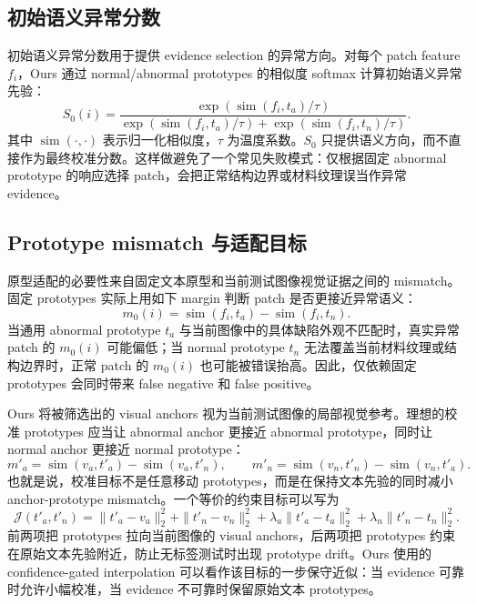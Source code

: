 \documentclass[runningheads]{llncs}
\newcommand{\simi}{\operatorname{sim}}
\begin{document}
\subsection{初始语义异常分数}

初始语义异常分数用于提供 evidence selection 的异常方向。对每个 patch feature $f_i$，Ours 通过 normal/abnormal prototypes 的相似度 softmax 计算初始语义异常先验：
\begin{equation}
S_0(i)=
\frac{\exp(\simi(f_i,t_a)/\tau)}
{\exp(\simi(f_i,t_a)/\tau)+\exp(\simi(f_i,t_n)/\tau)} .
\end{equation}
其中 $\simi(\cdot,\cdot)$ 表示归一化相似度，$\tau$ 为温度系数。$S_0$ 只提供语义方向，而不直接作为最终校准分数。这样做避免了一个常见失败模式：仅根据固定 abnormal prototype 的响应选择 patch，会把正常结构边界或材料纹理误当作异常 evidence。

\subsection{Prototype mismatch 与适配目标}

原型适配的必要性来自固定文本原型和当前测试图像视觉证据之间的 mismatch。固定 prototypes 实际上用如下 margin 判断 patch 是否更接近异常语义：
\begin{equation}
m_0(i)=\simi(f_i,t_a)-\simi(f_i,t_n).
\end{equation}
当通用 abnormal prototype $t_a$ 与当前图像中的具体缺陷外观不匹配时，真实异常 patch 的 $m_0(i)$ 可能偏低；当 normal prototype $t_n$ 无法覆盖当前材料纹理或结构边界时，正常 patch 的 $m_0(i)$ 也可能被错误抬高。因此，仅依赖固定 prototypes 会同时带来 false negative 和 false positive。

Ours 将被筛选出的 visual anchors 视为当前测试图像的局部视觉参考。理想的校准 prototypes 应当让 abnormal anchor 更接近 abnormal prototype，同时让 normal anchor 更接近 normal prototype：
\begin{equation}
m'_a=\simi(v_a,t'_a)-\simi(v_a,t'_n),\qquad
m'_n=\simi(v_n,t'_n)-\simi(v_n,t'_a).
\end{equation}
也就是说，校准目标不是任意移动 prototypes，而是在保持文本先验的同时减小 anchor-prototype mismatch。一个等价的约束目标可以写为
\begin{equation}
\mathcal{J}(t'_a,t'_n)=
\|t'_a-v_a\|_2^2+\|t'_n-v_n\|_2^2+
\lambda_a\|t'_a-t_a\|_2^2+
\lambda_n\|t'_n-t_n\|_2^2 .
\end{equation}
前两项把 prototypes 拉向当前图像的 visual anchors，后两项把 prototypes 约束在原始文本先验附近，防止无标签测试时出现 prototype drift。Ours 使用的 confidence-gated interpolation 可以看作该目标的一步保守近似：当 evidence 可靠时允许小幅校准，当 evidence 不可靠时保留原始文本 prototypes。
\end{document}
